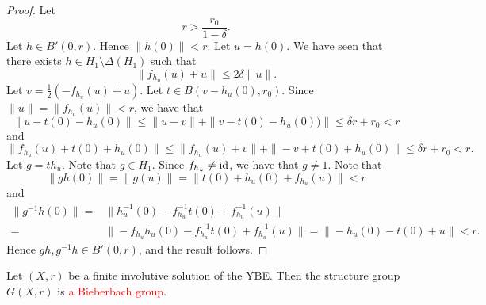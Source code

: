 \begin{proof}
Let 
\[ r> \frac{r_0}{1-\delta}.\]
Let $h\in B'(0,r)$. Hence $\|h(0)\|<r$.
Let $u=h(0)$. We have seen that there exists $h\in H_1\setminus \Delta(H_1)$ such that
\[ \|f_{h_u}(u)+u\|\leq 2\delta\| u\|.\]
Let $v=\frac{1}{2}(-f_{h_u}(u)+u)$. Let $t\in B(v-h_u(0),r_0)$. Since $\| u\|=\|f_{h_u}(u)\|<r$, we have that
\[ \| u-t(0)-h_u(0)\|\leq \|u-v\|+\|v-t(0)-h_u(0))\|\leq\delta r+r_0<r\]
and
\[ \| f_{h_u}(u)+t(0)+h_u(0)\|\leq \|f_{h_u}(u)+v\|+\|-v+t(0)+h_u(0)\|\leq\delta r+r_0<r.\]
Let $g=th_u$. Note that $g\in H_1$. Since $f_{h_u}\neq \operatorname{id}$, we have that $g\neq 1$.
Note that
\[    \|gh(0)\|=\|g(u)\|=\|t(0)+h_u(0)+f_{h_u}(u)\|<r
\]
and
\begin{align*}    \|g^{-1}h(0)\|=&\|h_u^{-1}(0)-f_{h_u}^{-1}t(0)+f_{h_u}^{-1}(u)\|\\
=&\|-f_{h_u}h_u(0)-f_{h_u}^{-1}t(0)+f_{h_u}^{-1}(u)\|=\|-h_u(0)-t(0)+u\|<r.
\end{align*}
Hence $gh,g^{-1}h\in B'(0,r)$, and the result follows.
\end{proof}

\begin{theorem}\label{thm:finiteinvol}
Let $(X,r)$ be a finite involutive solution of the YBE. Then the structure group $G(X,r)$ is \textcolor{red}{a  Bieberbach group}.
\end{theorem}

